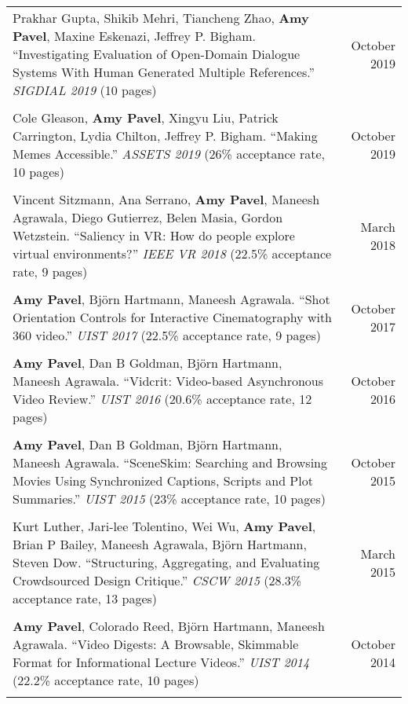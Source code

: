\begin{longtable}{Xr}
	Prakhar Gupta, Shikib Mehri, Tiancheng Zhao, \textbf{Amy Pavel}, Maxine Eskenazi, Jeffrey P. Bigham. ``Investigating Evaluation of Open-Domain Dialogue Systems With Human Generated Multiple References.'' \textit{SIGDIAL 2019} (10 pages) & October 2019 \\
	\\

	Cole Gleason, \textbf{Amy Pavel}, Xingyu Liu, Patrick Carrington, Lydia Chilton, Jeffrey P. Bigham. ``Making Memes Accessible.'' \textit{ASSETS 2019} (26\% acceptance rate, 10 pages) & October 2019 \\
	\\

	Vincent Sitzmann, Ana Serrano, \textbf{Amy Pavel}, Maneesh Agrawala, Diego Gutierrez, Belen Masia, Gordon Wetzstein. ``Saliency in VR: How do people explore virtual environments?'' \textit{IEEE VR 2018} (22.5\% acceptance rate, 9 pages) & March 2018 \\
	\\

	\textbf{Amy Pavel}, Björn Hartmann, Maneesh Agrawala. ``Shot Orientation Controls for Interactive Cinematography with 360 video.'' \textit{UIST 2017} (22.5\% acceptance rate, 9 pages) & October 2017 \\
	\\

	\textbf{Amy Pavel}, Dan B Goldman, Björn Hartmann, Maneesh Agrawala. ``Vidcrit: Video-based Asynchronous Video Review.'' \textit{UIST 2016} (20.6\% acceptance rate, 12 pages) & October 2016 \\
	\\

	\textbf{Amy Pavel}, Dan B Goldman, Björn Hartmann, Maneesh Agrawala. ``SceneSkim: Searching and Browsing Movies Using Synchronized Captions, Scripts and Plot Summaries.'' \textit{UIST 2015} (23\% acceptance rate, 10 pages) & October 2015 \\
	\\

	Kurt Luther, Jari-lee Tolentino, Wei Wu, \textbf{Amy Pavel}, Brian P Bailey, Maneesh Agrawala, Björn Hartmann, Steven Dow. ``Structuring, Aggregating, and Evaluating Crowdsourced Design Critique.'' \textit{CSCW 2015} (28.3\% acceptance rate, 13 pages) & March 2015 \\
	\\

	\textbf{Amy Pavel}, Colorado Reed, Björn Hartmann, Maneesh Agrawala. ``Video Digests: A Browsable, Skimmable Format for Informational Lecture Videos.'' \textit{UIST 2014} (22.2\% acceptance rate, 10 pages) & October 2014 \\
	\\

\end{longtable}